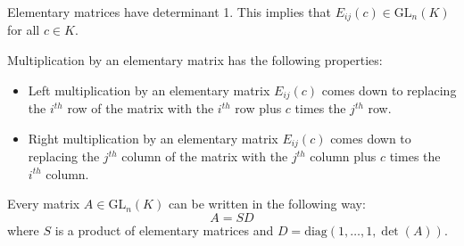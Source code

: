     \begin{property}[Invertibility]
        Elementary matrices have determinant 1. This implies that $E_{ij}(c)\in\text{GL}_n(K)$ for all $c\in K$.
    \end{property}
    \begin{property}
        Multiplication by an elementary matrix has the following properties:
        \begin{itemize}
            \item Left multiplication by an elementary matrix $E_{ij}(c)$ comes down to replacing the $i^{th}$ row of the matrix with the $i^{th}$ row plus $c$ times the $j^{th}$ row.
            \item Right multiplication by an elementary matrix $E_{ij}(c)$ comes down to replacing the $j^{th}$ column of the matrix with the $j^{th}$ column plus $c$ times the $i^{th}$ column.
        \end{itemize}
    \end{property}

    \begin{property}\label{linalgebra:theorem:elementary_matrices}
        Every matrix $A\in\text{GL}_n(K)$ can be written in the following way: \[A = SD\] where $S$ is a product of elementary matrices and $D=\text{diag}(1,\dotso,1,\det(A))$.
    \end{property}

